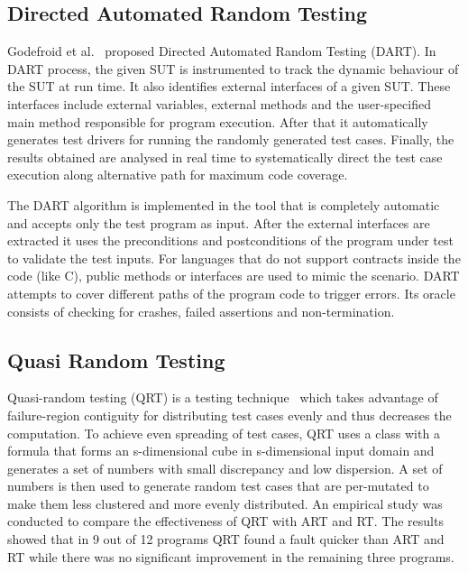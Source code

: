 \subsection{Directed Automated Random Testing}
Godefroid et al.~\cite{godefroid2005dart} proposed Directed Automated Random Testing (DART). %
In DART process, the given SUT is instrumented to track the dynamic behaviour of the SUT at run time. It also identifies external interfaces of a given SUT. These interfaces include external variables, external methods and the user-specified main method responsible for program execution. After that it automatically generates test drivers for running the randomly generated test cases. Finally, the results obtained are analysed in real time to systematically direct the test case execution along alternative path for maximum code coverage. 

The DART algorithm is implemented in the tool that is completely automatic and accepts only the test program as input. After the external interfaces are extracted it uses the preconditions and postconditions of the program under test to validate the test inputs. For languages that do not support contracts inside the code (like C), public methods or interfaces are used to mimic the scenario. DART attempts to cover different paths of the program code to trigger errors. Its oracle consists of checking for crashes, failed assertions and non-termination.



\subsection{Quasi Random Testing}
Quasi-random testing (QRT) is a testing technique~\cite{chen2007quasi} which takes advantage of failure-region contiguity for distributing test cases evenly and thus decreases the computation. %
To achieve even spreading of test cases, QRT uses a class with a formula that forms an s-dimensional cube in s-dimensional input domain and generates a set of numbers with small discrepancy and low dispersion. A set of numbers is then used to generate random test cases that are per-mutated to make them less clustered and more evenly distributed. An empirical study was conducted to compare the effectiveness of QRT with ART and RT. The results showed that in 9 out of 12 programs QRT found a fault quicker than ART and RT while there was no significant improvement in the remaining three programs.

